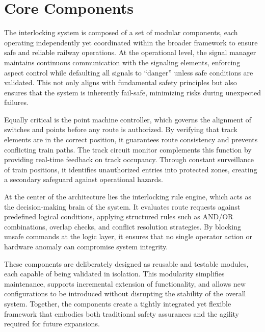 \section{Core Components}
\label{sec:system-overview:components}

The interlocking system is composed of a set of modular components, each operating independently yet coordinated within the broader framework to ensure safe and reliable railway operations. At the operational level, the signal manager maintains continuous communication with the signaling elements, enforcing aspect control while defaulting all signals to “danger” unless safe conditions are validated. This not only aligns with fundamental safety principles but also ensures that the system is inherently fail-safe, minimizing risks during unexpected failures.

Equally critical is the point machine controller, which governs the alignment of switches and points before any route is authorized. By verifying that track elements are in the correct position, it guarantees route consistency and prevents conflicting train paths. The track circuit monitor complements this function by providing real-time feedback on track occupancy. Through constant surveillance of train positions, it identifies unauthorized entries into protected zones, creating a secondary safeguard against operational hazards.

At the center of the architecture lies the interlocking rule engine, which acts as the decision-making brain of the system. It evaluates route requests against predefined logical conditions, applying structured rules such as AND/OR combinations, overlap checks, and conflict resolution strategies. By blocking unsafe commands at the logic layer, it ensures that no single operator action or hardware anomaly can compromise system integrity.

These components are deliberately designed as reusable and testable modules, each capable of being validated in isolation. This modularity simplifies maintenance, supports incremental extension of functionality, and allows new configurations to be introduced without disrupting the stability of the overall system. Together, the components create a tightly integrated yet flexible framework that embodies both traditional safety assurances and the agility required for future expansions.